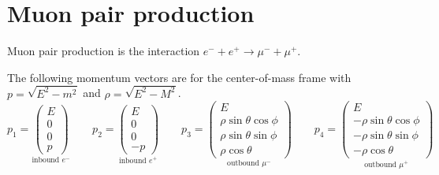 

\section*{Muon pair production}

Muon pair production is the interaction $e^-+e^+\rightarrow\mu^-+\mu^+$.

\begin{center}
\end{center}

The following momentum vectors are for the center-of-mass frame
with $p=\sqrt{E^2-m^2}$ and $\rho=\sqrt{E^2-M^2}$.
\begin{equation*}
p_1=\underset{\text{inbound $e^-$}}
{\begin{pmatrix}E\\0\\0\\p\end{pmatrix}}
\qquad
p_2=\underset{\text{inbound $e^+$}}
{\begin{pmatrix}E\\0\\0\\-p\end{pmatrix}}
\qquad
p_3=\underset{\text{outbound $\mu^-$}}
{\begin{pmatrix}
E\\
\rho\sin\theta\cos\phi\\
\rho\sin\theta\sin\phi\\
\rho\cos\theta
\end{pmatrix}}
\qquad
p_4=
\underset{\text{outbound $\mu^+$}}
{\begin{pmatrix}
E\\
-\rho\sin\theta\cos\phi\\
-\rho\sin\theta\sin\phi\\
-\rho\cos\theta
\end{pmatrix}}
\end{equation*}

